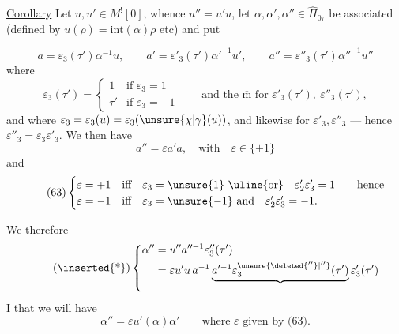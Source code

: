 \uline{Corollary} Let $u,u'\in M^![0]$, whence $u''=u'u$, let $\alpha,\alpha',\alpha''\in\widehat\Pi_{0\tau}$ be associated (defined by $u(\rho)=\mathrm{int}(\alpha)\rho$ etc) and put



\[
\tag{61}
a=\varepsilon_3(\tau')\alpha^{-1}u,\qquad
a'=\varepsilon'_3(\tau')\alpha'^{-1}u',\qquad
a''=\varepsilon''_3(\tau')\alpha''^{-1}u''
\]
where
\[
\varepsilon_3(\tau')=
\begin{cases}
1&\text{if }\varepsilon_3=1\\
\tau'&\text{if }\varepsilon_3=-1
\end{cases}
\qquad
\text{and the }\overline{\mathrm m}\text{ for }\varepsilon'_3(\tau'),\ \varepsilon''_3(\tau'),
\]
and where $\varepsilon_3=\varepsilon_3(u)=\varepsilon_3(\unsure{\chi|\gamma}(u))$,
and likewise for $\varepsilon'_3,\varepsilon''_3$
--- hence $\varepsilon''_3=\varepsilon_3\varepsilon'_3$. We then have
\[
\tag{62}
a''=\varepsilon a'a,\quad\text{with}\quad\varepsilon\in\{\pm1\}
\]
and
\[
\tag{63}
\begin{cases}
\varepsilon=+1&\text{iff}\quad \varepsilon_3=\unsure{1}\ \text{\uline{or}}\quad
\varepsilon'_2\varepsilon'_3=1\qquad\text{hence}\\
\varepsilon=-1&\text{iff}\quad \varepsilon_3=\unsure{-1}\ \text{and}\quad
\varepsilon'_2\varepsilon'_3=-1.
\end{cases}
\]

We  therefore
\[
\tag{\inserted{*}}
\left\{
\begin{aligned}
\alpha''&=u''a''^{-1}\varepsilon''_3(\tau')\\
&=\varepsilon u'u\,a^{-1}\underbrace{a'^{-1}\varepsilon_3^{\unsure{\deleted{''}|''}}(\tau')}_{\vphantom{A}}\varepsilon'_3(\tau')
\end{aligned}
\right.
\]
I 
 that we will have
\[
\tag{64}
\alpha''=\varepsilon u'(\alpha)\alpha'
\qquad\text{where }\varepsilon\text{ given by (63).}
\]

